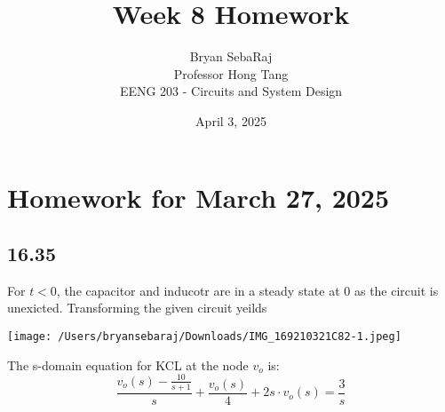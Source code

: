 \documentclass{article}
\title{Week 8 Homework}
\author{Bryan SebaRaj \\[0.7em] Professor Hong Tang \\[0.7em]  EENG 203 - Circuits and System Design}
\date{April 3, 2025}
\begin{document}
\maketitle

\section*{Homework for March 27, 2025}

\subsection*{16.35}


For $t<0$, the capacitor and inducotr are in a steady state at 0 as the circuit is unexicted. Transforming the given circuit yeilds

\begin{center}
    \texttt{[image: /Users/bryansebaraj/Downloads/IMG\_169210321C82-1.jpeg]}
\end{center}
%
%
%
%
%
%
%
%
%
%
%
%
%
%
%
%
%
%
The s-domain equation for KCL at the node $v_o$ is:
$$\frac{v_o(s) - \frac{10}{s+1}}{s} + \frac{v_o(s)}{4} + 2s\cdot v_o(s) = \frac{3}{s}$$
\end{document}
